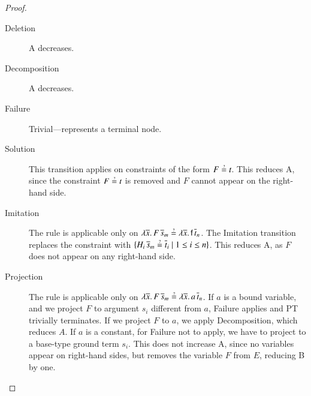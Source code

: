 \begin{proof}
    \begin{description}
      \item[Deletion] A decreases.
      \item[Decomposition] A decreases.
      \item[Failure] Trivial---represents a terminal node.
      \item[Solution] This transition applies on 
        constraints of the form
        $F \unif t$. This reduces A, since the constraint $F \unif t$ is removed
        and $F$ cannot appear on the right-hand side.
      \item[Imitation] The rule is applicable only on 
        $\lambda \overline{x}.\, F \, \overline{s}_m  \unif \lambda
        \overline{x}.\, \cst{f} \, \overline{t}_n$. The \textsf{Imitation} transition
        replaces the constraint with $\{H_i \,
        \overline{s}_m  \unif \overline{t}_i \mid 1\le i\le n\}$. This reduces A, as $F$ does not appear on any right-hand side.
    \item[Projection] The rule is applicable only on 
        $\lambda \overline{x}.\, F \, \overline{s}_m  \unif \lambda
        \overline{x}.\, a \, \overline{t}_n$. If $a$ is a bound variable,
        and we project $F$ to argument $s_i$ different from $a$, \textsf{Failure} applies and
        PT trivially terminates. If we project $F$ to $a$, we apply \textsf{Decomposition},
        which reduces $A$. If $a$ is a constant, for \textsf{Failure} not to apply, we
        have to project to a base-type ground term $s_i$. This does not increase A,
        since no variables appear on right-hand sides, but removes the variable $F$
        from $E$, reducing B by one. \qedhere
    \end{description}
\end{proof}

